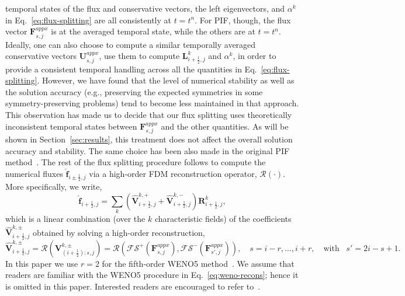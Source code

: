 \documentclass[times,preprint,3p]{elsarticle}
\newcommand{\bff}{\mathbf{f}}
\newcommand{\half}{\frac{1}{2}}
\newcommand{\bF}{\mathbf{F}}
\newcommand{\bL}{\mathbf{L}}
\newcommand{\bR}{\mathbf{R}}
\newcommand{\bU}{\mathbf{U}}
\newcommand{\bV}{\mathbf{V}}
\begin{document}
temporal states of the flux and conservative vectors,
the left eigenvectors, and $\alpha^k$ in Eq.~\eqref{eq:flux-splitting}
are all consistently at $t=t^n$.
For PIF, though, the flux vector $\bF^{appx}_{s,j}$ is at the averaged temporal state, while
the others are at $t=t^n$. Ideally, one can also choose to compute a similar temporally averaged
conservative vectors $\bU^{appx}_{s,j}$, use them to compute $\bL_{i+\half,j}^k$ and $\alpha^k$,
in order to provide a consistent temporal handling across all the quantities in Eq.~\eqref{eq:flux-splitting}.
However, we have found that the level of numerical stability as well as the solution accuracy (e.g.,
preserving the expected symmetries in some symmetry-preserving problems) tend to become
less maintained in that approach. This observation has made us to decide that our flux splitting
uses theoretically inconsistent temporal states between $\bF^{appx}_{s,j}$ and the other quantities.
As will be shown in Section~\ref{sec:results}, this treatment does not affect the overall solution accuracy
and stability. The same choice has been also made in the original PIF method~\cite{christlieb2015picard}.
The rest of the flux splitting procedure follows to compute the numerical fluxes $\hat{\bff}_{i\pm \half,j}$
via a high-order FDM reconstruction operator, $\mathcal{R}(\cdot)$. More specifically, we write,
%
\begin{equation}\label{eq:flux-splitting-final}
    \hat{\bff}_{i+\half,j} = %
    \sum\limits_{k}\left( \hat{\bV}_{i+\half,j}^{k,+} + \hat{\bV}_{i+\half,j}^{k,-}\right) \bR^{k}_{i+\half,j},
\end{equation}
%
which is a linear combination (over the $k$ characteristic fields) of
the coefficients $\hat{\bV}_{i+\half,j}^{k,\pm}$ obtained by
solving a high-order reconstruction,
\begin{equation}\label{eq:weno-recons}
    \hat{\bV}_{i+\half,j}^{k,\pm} =
    \mathcal{R}\left(
        \bV^{k,\pm}_{(i+\half):{s},j}
    \right)
    =
    \mathcal{R}\left(
        \mathcal{FS}^{+}(\bF^{appx}_{s,j}),
        \mathcal{FS}^{-}(\bF^{appx}_{s',j})
    \right),
    \quad s=i-r, \dots, i+r,
    \quad \mbox{with} \;\;\;
    s'=2i-s+1.
\end{equation}
In this paper we use $r=2$ for the fifth-order WENO5 method~\cite{jiang1996efficient}.
%
We assume that readers are familiar with the WENO5 procedure in Eq.~\eqref{eq:weno-recons};
hence it is omitted in this paper. Interested readers are
encouraged to refer to~\cite{jiang1996efficient,mignone2010high}.
\end{document}
